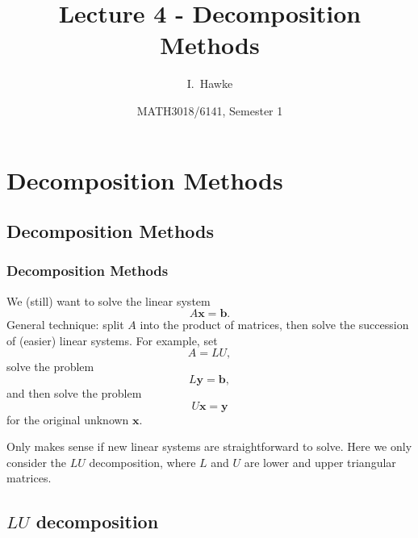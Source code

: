 \documentclass{beamer}
\title[Lecture 4] %
{Lecture 4 - Decomposition Methods}
\author[I. Hawke] %
{I.~Hawke}
\institute[University of Southampton] %
{
  School of Mathematics, \\
  University of Southampton, UK
}
\date[Semester 1] %
{MATH3018/6141, Semester 1}
\newcommand{\bb}{{\boldsymbol{b}}}
\newcommand{\bx}{{\boldsymbol{x}}}
\newcommand{\by}{{\boldsymbol{y}}}
\begin{document}
\begin{frame}
  \titlepage
\end{frame}

\section{Decomposition Methods}

\subsection{Decomposition Methods}

\begin{frame}
  \frametitle{Decomposition Methods}

  We (still) want to solve the linear system
  \begin{equation*}
    A \bx = \bb.
  \end{equation*}
  General technique: split $A$ into the product of matrices, then
  solve the succession of (easier) linear systems. \pause For example,
  set
  \begin{equation*}
    A = L U,
  \end{equation*}
  solve the problem
  \begin{equation*}
    L \by = \bb,
  \end{equation*}
  and then solve the problem
  \begin{equation*}
    U \bx = \by
  \end{equation*}
  for the original unknown $\bx$. \pause

  Only makes sense if new linear systems are straightforward to
  solve. Here we only consider the $LU$ decomposition, where $L$ and
  $U$ are lower and upper triangular matrices.

\end{frame}


\subsection{\texorpdfstring{$LU$ decomposition}{LU decomposition}}
\end{document}
